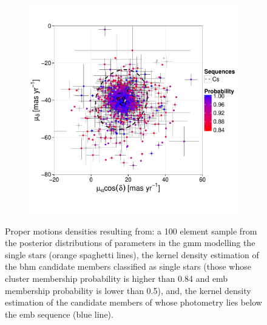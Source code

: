 \begin{figure}[ht!]
\begin{subfigure}[t]{0.45\textwidth}
     \includegraphics[page=3,width=\textwidth]{background/Figures/BHM/Cs_members.pdf}
        \caption{}
    \end{subfigure}
\caption{Proper motions densities resulting from: a 100 element sample from the posterior distributions of parameters in the \gls{gmm} modelling the single stars (orange spaghetti lines), the kernel density estimation of the \gls{bhm} candidate members classified as single stars (those whose cluster membership probability is higher than 0.84 and \gls{emb} membership probability is lower than 0.5), and, the kernel density estimation of the candidate members of \citet{Bouy2015} whose photometry lies below the \gls{emb} sequence (blue line).}
\label{fig:PMCs}
\end{figure}

